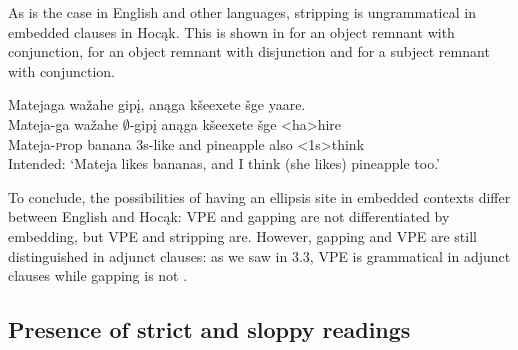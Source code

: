 \documentclass[output=paper]{LSP/langsci}
\begin{document}
As is the case in English and other languages, stripping is ungrammatical in embedded clauses in Hocąk. This is shown in  for an object remnant with conjunction,  for an object remnant with disjunction and  for a subject remnant with conjunction.
 
\ea
\ea\label{ex:johnson:41a}
\glll Matejaga wažahe gipį, anąga kšeexete šge yaare.\\
Mateja-ga wažahe $\emptyset$-gipį anąga kšeexete šge <ha>hire\\
Mateja-{\textsc prop} banana {\textsc 3s}-like and pineapple also <{\textsc 1s}>think\\
\trans Intended: `Mateja likes bananas, and I think (she likes) pineapple too.'
 

 
\z
\z

To conclude, the possibilities of having an ellipsis site in embedded contexts differ between English and Hocąk: VPE and gapping are not differentiated by embedding, but VPE and stripping are. However, gapping and VPE are still distinguished in adjunct clauses: as we saw in 3.3, VPE is grammatical in adjunct clauses  while gapping is not .

\subsection{Presence of strict and sloppy readings}\label{sec:johnson:3.5}
\end{document}
